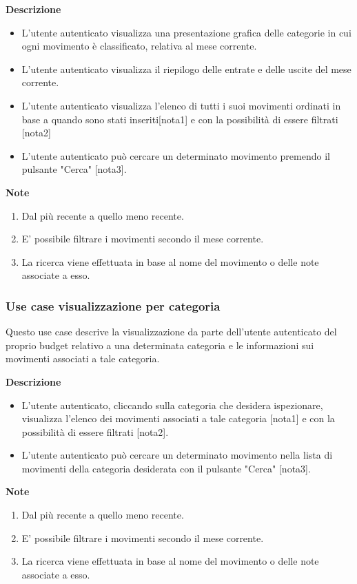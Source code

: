 \documentclass[a4paper,12pt]{article}
\begin{document}
\textbf{Descrizione}
\begin{itemize} \setlength\itemsep{0.01em}
\item L'utente autenticato visualizza una presentazione grafica delle categorie in cui ogni movimento è classificato, relativa al mese corrente.
\item L'utente autenticato visualizza il riepilogo delle entrate e delle uscite del mese corrente.
\item L'utente autenticato visualizza l'elenco di tutti i suoi movimenti ordinati in base a quando sono stati inseriti[nota1] e con la possibilità di essere filtrati [nota2]
\item L'utente autenticato può cercare un determinato movimento premendo il pulsante "Cerca" [nota3].
\end{itemize}

\textbf{Note}
\begin{enumerate} \setlength\itemsep{0.01em}
\item Dal più recente a quello meno recente.
\item E' possibile filtrare i movimenti secondo il mese corrente.
\item La ricerca viene effettuata in base al nome del movimento o delle note associate a esso.
\end{enumerate}


\subsubsection*{Use case visualizzazione per categoria}

Questo use case descrive la visualizzazione da parte dell'utente autenticato del proprio budget relativo a una determinata categoria e le informazioni sui movimenti associati a tale categoria.

\textbf{Descrizione}
\begin{itemize} \setlength\itemsep{0.01em}
\item L'utente autenticato, cliccando sulla categoria che desidera ispezionare, visualizza l'elenco dei movimenti associati a tale categoria [nota1] e con la possibilità di essere filtrati [nota2].
\item L'utente autenticato può cercare un determinato movimento nella lista di movimenti della categoria desiderata con il pulsante "Cerca" [nota3].
\end{itemize}

\textbf{Note}
\begin{enumerate} \setlength\itemsep{0.01em}
\item Dal più recente a quello meno recente.
\item E' possibile filtrare i movimenti secondo il mese corrente.
\item La ricerca viene effettuata in base al nome del movimento o delle note associate a esso.
\end{enumerate}
\end{document}
